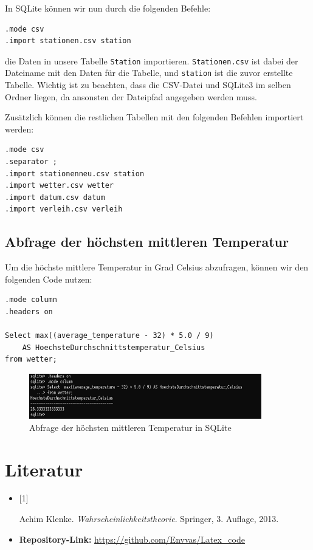 \documentclass{article}
\begin{document}
In SQLite können wir nun durch die folgenden Befehle:

\begin{verbatim}
.mode csv
.import stationen.csv station
\end{verbatim}

die Daten in unsere Tabelle \texttt{Station} importieren. \texttt{Stationen.csv} ist dabei der Dateiname mit den Daten für die Tabelle, und \texttt{station} ist die zuvor erstellte Tabelle. Wichtig ist zu beachten, dass die CSV-Datei und SQLite3 im selben Ordner liegen, da ansonsten der Dateipfad angegeben werden muss.

Zusätzlich können die restlichen Tabellen mit den folgenden Befehlen importiert werden:

\begin{verbatim}
.mode csv
.separator ;
.import stationenneu.csv station
.import wetter.csv wetter
.import datum.csv datum
.import verleih.csv verleih
\end{verbatim}

\newpage 
\newpage 

\subsection{Abfrage der höchsten mittleren Temperatur}
\label{sec:highest-temp-query}

Um die höchste mittlere Temperatur in Grad Celsius abzufragen, können wir den folgenden Code nutzen:

\begin{verbatim}
.mode column
.headers on

Select max((average_temperature - 32) * 5.0 / 9) 
    AS HoechsteDurchschnittstemperatur_Celsius
from wetter;
\end{verbatim}

\begin{figure}[h!]
    \centering
    \includegraphics[width=0.9\textwidth]{letztes b.png}
    \caption{Abfrage der höchsten mittleren Temperatur in SQLite}
    \label{fig:highest-temp-query}
\end{figure}

\newpage 


\section*{Literatur}
\begin{itemize}
    \item \hypertarget{litref}{[1]} Achim Klenke. \textit{Wahrscheinlichkeitstheorie}. Springer, 3. Auflage, 2013.
    \item \textbf{Repository-Link:} \url{https://github.com/Envvas/Latex_code}
\end{itemize}
\end{document}
